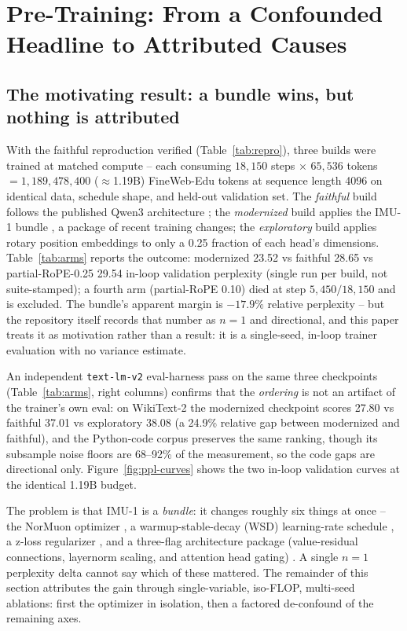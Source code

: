 \section{Pre-Training: From a Confounded Headline to Attributed Causes}\label{sec:pretrain}

\subsection{The motivating result: a bundle wins, but nothing is attributed}\label{sec:pretrain-motivation}

With the faithful reproduction verified (Table~\ref{tab:repro}), three builds were
trained at matched compute -- each consuming $18{,}150$ steps $\times$
$65{,}536$ tokens $= 1{,}189{,}478{,}400$ ($\approx$1.19B) FineWeb-Edu tokens
\citep{penedo2024fineweb} at sequence length 4096 on identical data, schedule
shape, and held-out validation set. The \emph{faithful} build follows the
published Qwen3 architecture \citep{yang2025qwen3}; the \emph{modernized}
build applies the IMU-1 bundle \citep{grigorev2026imu}, a package of recent
training changes; the \emph{exploratory} build applies rotary position
embeddings \citep{su2021roformer} to only a 0.25 fraction of each head's
dimensions. Table~\ref{tab:arms} reports the outcome: modernized 23.52 vs
faithful 28.65 vs partial-RoPE-0.25 29.54 in-loop validation perplexity
(single run per build, not suite-stamped); a fourth arm (partial-RoPE 0.10)
died at step $5{,}450/18{,}150$ and is excluded. The bundle's apparent margin
is $-17.9\%$ relative perplexity -- but the repository itself records that
number as $n{=}1$ and directional, and this paper treats it as motivation
rather than a result: it is a single-seed, in-loop trainer evaluation with no
variance estimate.



An independent \texttt{text-lm-v2} eval-harness pass on the same three
checkpoints (Table~\ref{tab:arms}, right columns) confirms that the
\emph{ordering} is not an artifact of the trainer's own eval: on WikiText-2
the modernized checkpoint scores 27.80 vs faithful 37.01 vs exploratory 38.08
(a 24.9\% relative gap between modernized and faithful), and the Python-code
corpus preserves the same ranking, though its subsample noise floors are
68--92\% of the measurement, so the code gaps are directional only.
Figure~\ref{fig:ppl-curves} shows the two in-loop validation curves at the
identical 1.19B budget.

The problem is that IMU-1 is a \emph{bundle}: it changes roughly six things at
once -- the NorMuon optimizer \citep{li2025normuon}, a warmup-stable-decay
(WSD) learning-rate schedule \citep{hu2024minicpm}, a z-loss regularizer
\citep{chowdhery2022palm}, and a three-flag architecture package
(value-residual connections, layernorm scaling, and attention head gating)
\citep{grigorev2026imu}. A single $n{=}1$ perplexity delta cannot say which of
these mattered. The remainder of this section attributes the gain through
single-variable, iso-FLOP, multi-seed ablations: first the optimizer in
isolation, then a factored de-confound of the remaining axes.

